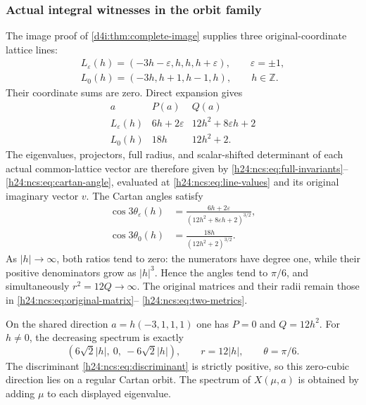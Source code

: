 \subsubsection{Actual integral witnesses in the orbit family}
\label{h24:ncs:sec:integral-witnesses}

The image proof of \cref{d4i:thm:complete-image} supplies three
original-coordinate lattice lines:
\begin{equation}
 \begin{gathered}
 L_\varepsilon(h)=(-3h-\varepsilon,h,h,h+\varepsilon),
       \qquad\varepsilon=\pm1,\\
 L_0(h)=(-3h,h+1,h-1,h),\qquad h\in\mathbb Z.
 \end{gathered}
 \label{h24:ncs:eq:integral-lines}\tag{NCS20}
\end{equation}
Their coordinate sums are zero. Direct expansion gives
\begin{equation}
 \begin{array}{c|c|c}
 a&P(a)&Q(a)\\\hline
 L_\varepsilon(h)&6h+2\varepsilon&12h^2+8\varepsilon h+2\\
 L_0(h)&18h&12h^2+2.
 \end{array}
 \label{h24:ncs:eq:line-values}\tag{NCS21}
\end{equation}
The eigenvalues, projectors, full radius, and scalar-shifted
determinant of each actual common-lattice vector are therefore
given by \eqref{h24:ncs:eq:full-invariants}--
\eqref{h24:ncs:eq:cartan-angle}, evaluated at
\eqref{h24:ncs:eq:line-values} and its original imaginary vector $v$.
The Cartan angles satisfy
\begin{equation}
 \begin{aligned}
 \cos3\theta_\varepsilon(h)
    &=\frac{6h+2\varepsilon}
                  {(12h^2+8\varepsilon h+2)^{3/2}},\\
 \cos3\theta_0(h)&=\frac{18h}{(12h^2+2)^{3/2}}.
 \end{aligned}
 \label{h24:ncs:eq:line-angles}\tag{NCS22}
\end{equation}
As $|h|\to\infty$, both ratios tend to zero: the numerators
have degree one, while their positive denominators grow as
$|h|^3$. Hence the angles tend to $\pi/6$, and simultaneously
$r^2=12Q\to\infty$. The original matrices and their radii
remain those in \eqref{h24:ncs:eq:original-matrix}--
\eqref{h24:ncs:eq:two-metrics}.

On the shared direction $a=h(-3,1,1,1)$ one has $P=0$ and
$Q=12h^2$. For $h\ne0$, the decreasing spectrum is exactly
\begin{equation}
 (6\sqrt2|h|,\ 0,\ -6\sqrt2|h|),\qquad
 r=12|h|,\qquad\theta=\pi/6.
 \label{h24:ncs:eq:zero-cubic-direction}\tag{NCS23}
\end{equation}
The discriminant \eqref{h24:ncs:eq:discriminant} is strictly positive,
so this zero-cubic direction lies on a regular Cartan orbit.
The spectrum of $X(\mu,a)$ is obtained by adding $\mu$ to each
displayed eigenvalue.


